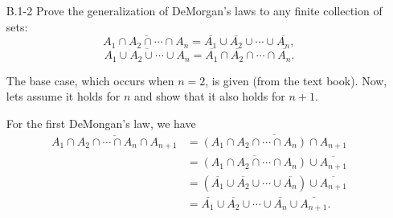 \begin{enumerate}
\begin{framed}
\begin{center}
\end{center}
\end{framed}

\item[B.1{-}2] {Prove the generalization of DeMorgan's laws to any finite
collection of sets:
\[
  \overline{A_1 \cap A_2 \cap \cdots \cap A_n} = \overline{A_1} \cup \overline{A_2} \cup \cdots \cup \overline{A_n},
\]
\[
  \overline{A_1 \cup A_2 \cup \cdots \cup A_n} = \overline{A_1} \cap \overline{A_2} \cap \cdots \cap \overline{A_n}.
\]
}

\begin{framed}
The base case, which occurs when $n = 2$, is given (from the text book). Now,
lets assume it holds for $n$ and show that it also holds for $n + 1$.

For the first DeMongan's law, we have
\begin{equation*}
\begin{aligned}
  \overline{A_1 \cap A_2 \cap \cdots \cap A_n \cap A_{n + 1}}
  &= \overline{(A_1 \cap A_2 \cap \cdots \cap A_n) \cap A_{n + 1}}\\
  &= \overline{(A_1 \cap A_2 \cap \cdots \cap A_n)} \cup \overline{A_{n + 1}}\\
  &= (\overline{A_1} \cup \overline{A_2} \cup \cdots \cup \overline{A_n}) \cup \overline{A_{n + 1}}\\
  &= \overline{A_1} \cup \overline{A_2} \cup \cdots \cup \overline{A_n} \cup \overline{A_{n + 1}}.
\end{aligned}
\end{equation*}


\end{framed}
\end{enumerate}
